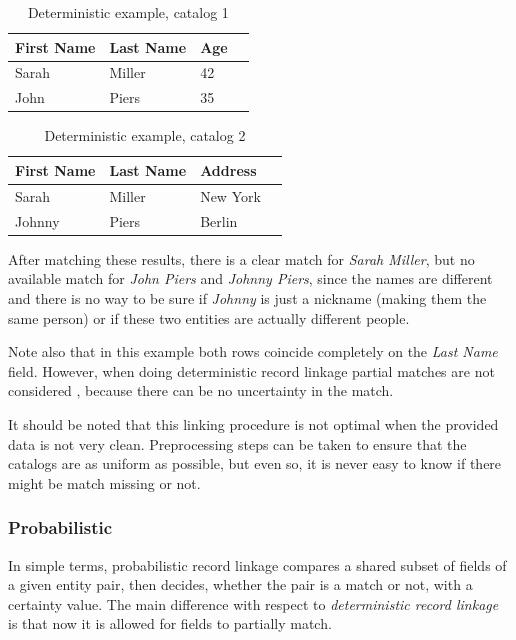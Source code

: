 \documentclass[epsfig,a4paper,11pt,titlepage,twoside,openany]{book}
\begin{document}
\begin{table}[H]
  \centering{}
  \begin{tabular}{|l|l|l|l|}
    First Name & Last Name & Age \\ \hline
    Sarah & Miller & 42 \\
    John  & Piers  & 35  \\ 
  \end{tabular}
  \caption{Deterministic example, catalog 1}
  \label{tab:ex-deterministic-1}
\end{table}


\begin{table}[H]
  \centering{}
  \begin{tabular}{|l|l|l|l|}
    First Name & Last Name & Address \\ \hline
    Sarah  & Miller & New York \\
    Johnny & Piers  & Berlin  \\ 
  \end{tabular}
  \caption{Deterministic example, catalog 2}
  \label{tab:ex-deterministic-2}
\end{table}

After matching these results, there is a clear match for \textit{Sarah Miller}, but no available match for \textit{John Piers} and \textit{Johnny Piers}, since the
names are different and there is no way to be sure if \textit{Johnny} is just a nickname (making them the same person)
or if these two entities are actually different people.

Note also that in this example both rows coincide completely on the \textit{Last Name} field. However, when doing deterministic record linkage partial matches are not considered \cite{dusetzina_m_2014}, because there can be no uncertainty in the match.

It should be noted that this linking procedure is not optimal when the provided data is not very clean. Preprocessing steps can be taken to ensure that the catalogs are as
uniform as possible, but even so, it is never easy to know if there might be match missing or not.


\subsubsection{Probabilistic}
\label{sec:rl-approach-probabilistic}

In simple terms, probabilistic record linkage \cite{Sayers2015} compares a shared subset of fields of a given entity pair, then decides, whether the pair is a match or not, with a certainty value. The main difference with respect to \textit{deterministic record linkage} is that now it is allowed for fields to partially match.
\end{document}

